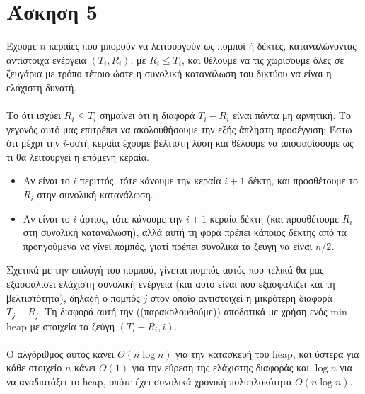 \documentclass[12pt,a4paper]{article}
\begin{document}
  
  
  \section{Άσκηση 5}

    Έχουμε \( n \) κεραίες που μπορούν να  λειτουργούν ως πομποί ή δέκτες,
    καταναλώνοντας αντίστοιχα ενέργεια \( (T_i, R_i) \), με \( R_i \le T_i \),
    και θέλουμε να τις χωρίσουμε όλες σε ζευγάρια με τρόπο τέτοιο ώστε η
    συνολική κατανάλωση του δικτύου να είναι η ελάχιστη δυνατή.\\
    \\
    Το ότι ισχύει \( R_i \le T_i \) σημαίνει ότι η διαφορά \( T_i - R_i \)
    είναι πάντα μη αρνητική. Το γεγονός αυτό μας επιτρέπει να ακολουθήσουμε την
    εξής άπληστη προσέγγιση: Έστω ότι μέχρι την \( i \)-οστή
    κεραία έχουμε βέλτιστη λύση και θέλουμε να αποφασίσουμε ως τι θα 
    λειτουργεί η επόμενη κεραία.
    \begin{itemize}
      \item Αν είναι το \( i \) περιττός, τότε κάνουμε 
            την κεραία \( i + 1 \) δέκτη, και προσθέτουμε το \( R_i \) στην
            συνολική κατανάλωση.
      \item Αν είναι το \( i \) άρτιος, τότε κάνουμε την \( i + 1 \) κεραία
            δέκτη (και προσθέτουμε \( R_i \) στη συνολική κατανάλωση), αλλά αυτή
            τη φορά πρέπει κάποιος δέκτης από τα προηγούμενα να
            γίνει πομπός, γιατί πρέπει συνολικά τα ζεύγη να είναι \( n/2 \).
    \end{itemize}
    Σχετικά με την επιλογή του πομπού, γίνεται πομπός αυτός που τελικά θα μας
    εξασφαλίσει ελάχιστη συνολική ενέργεια (και αυτό είναι που εξασφαλίζει και
    τη βελτιστότητα), δηλαδή ο πομπός \( j \) στον οποίο αντιστοιχεί η μικρότερη
    διαφορά \( T_j - R_j \). Τη διαφορά αυτή την ((παρακολουθούμε)) αποδοτικά
    με χρήση ενός {\latintext min-heap} με στοιχεία τα ζεύγη \( (Τ_i - R_i,
    i) \).\\
    \\
    O αλγόριθμος αυτός κάνει \( Ο(n\log{n}) \) για την κατασκευή του {\latintext
    heap}, και ύστερα για κάθε στοιχείο \( n \) κάνει \( O(1) \) για την
    εύρεση της ελάχιστης διαφοράς και \( \log{n} \) για να αναδιατάξει το
    {\latintext heap}, οπότε έχει συνολικά χρονική πολυπλοκότητα \( O(n\log{n})
    \).
\end{document}
